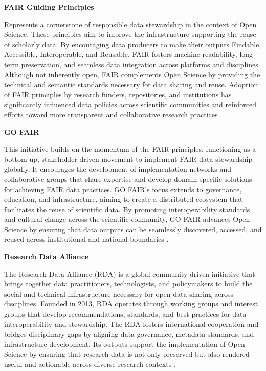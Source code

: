 \documentclass[final]{rc-book-2.14}
\begin{document}
\textbf{FAIR Guiding Principles} 

Represents a cornerstone of responsible data stewardship in the context of Open Science. These principles aim to improve the infrastructure supporting the reuse of scholarly data. By encouraging data producers to make their outputs Findable, Accessible, Interoperable, and Reusable, FAIR fosters machine-readability, long-term preservation, and seamless data integration across platforms and disciplines. Although not inherently open, FAIR complements Open Science by providing the technical and semantic standards necessary for data sharing and reuse. Adoption of FAIR principles by research funders, repositories, and institutions has significantly influenced data policies across scientific communities and reinforced efforts toward more transparent and collaborative research practices \cite{wilkinson_fair_2016}.


\textbf{GO FAIR}

This initiative builds on the momentum of the FAIR principles, functioning as a bottom-up, stakeholder-driven movement to implement FAIR data stewardship globally. It encourages the development of implementation networks and collaborative groups that share expertise and develop domain-specific solutions for achieving FAIR data practices. GO FAIR’s focus extends to governance, education, and infrastructure, aiming to create a distributed ecosystem that facilitates the reuse of scientific data. By promoting interoperability standards and cultural change across the scientific community, GO FAIR advances Open Science by ensuring that data outputs can be seamlessly discovered, accessed, and reused across institutional and national boundaries \cite{henning_go_2019}.


\textbf{Research Data Alliance}

The Research Data Alliance (RDA) is a global community-driven initiative that brings together data practitioners, technologists, and policymakers to build the social and technical infrastructure necessary for open data sharing across disciplines. Founded in 2013, RDA operates through working groups and interest groups that develop recommendations, standards, and best practices for data interoperability and stewardship. The RDA fosters international cooperation and bridges disciplinary gaps by aligning data governance, metadata standards, and infrastructure development. Its outputs support the implementation of Open Science by ensuring that research data is not only preserved but also rendered useful and actionable across diverse research contexts \cite{berman_research_2020}.
\end{document}
